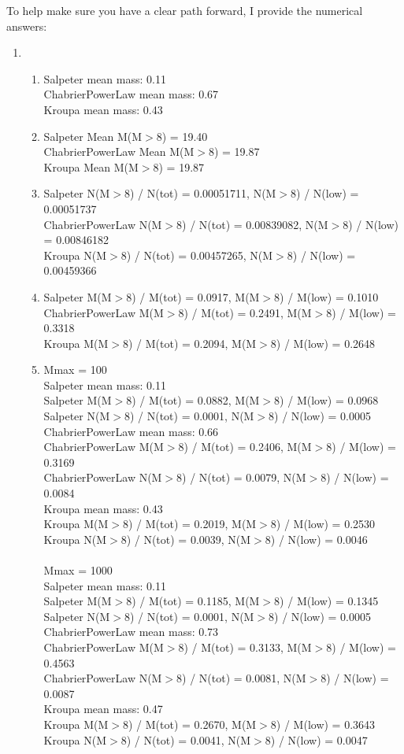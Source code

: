 \documentclass{article}
\begin{document}
\clearpage
To help make sure you have a clear path forward, I provide the numerical
answers:
\begin{enumerate}
    \item
\begin{enumerate}
    \item
        Salpeter mean mass: 0.11 \\
ChabrierPowerLaw mean mass: 0.67 \\
Kroupa mean mass: 0.43
\item Salpeter Mean M(M$>$8) = 19.40\\
ChabrierPowerLaw Mean M(M$>$8) = 19.87\\
Kroupa Mean M(M$>$8) = 19.87
\item Salpeter N(M$>$8) / N(tot) = 0.00051711, N(M$>$8) / N(low) = 0.00051737\\
ChabrierPowerLaw N(M$>$8) / N(tot) = 0.00839082, N(M$>$8) / N(low) = 0.00846182\\
Kroupa N(M$>$8) / N(tot) = 0.00457265, N(M$>$8) / N(low) = 0.00459366
\item Salpeter M(M$>$8) / M(tot) = 0.0917, M(M$>$8) / M(low) = 0.1010 \\
ChabrierPowerLaw M(M$>$8) / M(tot) = 0.2491, M(M$>$8) / M(low) = 0.3318 \\
Kroupa M(M$>$8) / M(tot) = 0.2094, M(M$>$8) / M(low) = 0.2648
\item Mmax = 100 \\
Salpeter mean mass: 0.11 \\
Salpeter M(M$>$8) / M(tot) = 0.0882, M(M$>$8) / M(low) = 0.0968 \\
Salpeter N(M$>$8) / N(tot) = 0.0001, N(M$>$8) / N(low) = 0.0005 \\
ChabrierPowerLaw mean mass: 0.66 \\
ChabrierPowerLaw M(M$>$8) / M(tot) = 0.2406, M(M$>$8) / M(low) = 0.3169 \\
ChabrierPowerLaw N(M$>$8) / N(tot) = 0.0079, N(M$>$8) / N(low) = 0.0084 \\
Kroupa mean mass: 0.43 \\
Kroupa M(M$>$8) / M(tot) = 0.2019, M(M$>$8) / M(low) = 0.2530 \\
Kroupa N(M$>$8) / N(tot) = 0.0039, N(M$>$8) / N(low) = 0.0046 \\
 \\
Mmax = 1000 \\
Salpeter mean mass: 0.11 \\
Salpeter M(M$>$8) / M(tot) = 0.1185, M(M$>$8) / M(low) = 0.1345 \\
Salpeter N(M$>$8) / N(tot) = 0.0001, N(M$>$8) / N(low) = 0.0005 \\
ChabrierPowerLaw mean mass: 0.73 \\
ChabrierPowerLaw M(M$>$8) / M(tot) = 0.3133, M(M$>$8) / M(low) = 0.4563 \\
ChabrierPowerLaw N(M$>$8) / N(tot) = 0.0081, N(M$>$8) / N(low) = 0.0087 \\
Kroupa mean mass: 0.47 \\
Kroupa M(M$>$8) / M(tot) = 0.2670, M(M$>$8) / M(low) = 0.3643 \\
Kroupa N(M$>$8) / N(tot) = 0.0041, N(M$>$8) / N(low) = 0.0047


\end{enumerate}
\end{enumerate}
\end{document}
